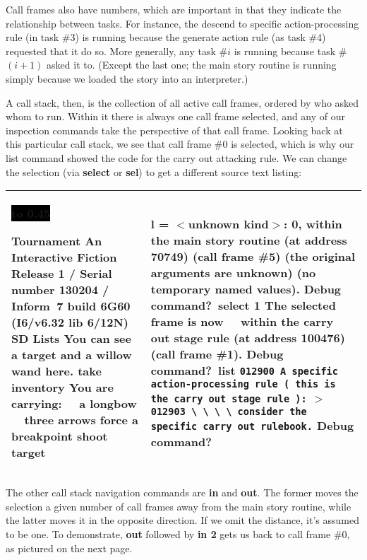 \documentclass{book}
\newcommand{\n}{\hspace*{\fill}\newline}
\newcommand{\terp}[2]{\begin{center}\begin{tabular}{p{0.45\textwidth}|p{0.45\textwidth}}\midrule #1&#2\\\midrule\end{tabular}\end{center}}
\newcommand{\glkheading}[1]{\textbf{#1}}
\newcommand{\glkinput}[1]{\textbf{#1}}
\newcommand{\glkstatusline}[2]{\centerline{\colorbox{black}{\hbox to 0.45\textwidth{\textcolor{white}{#1\hfil #2}}}}}
\newcommand{\storyprompt}{\raisebox{1.5pt}{\(>\)}}
\newcommand{\cursor}{\raisebox{-1.5pt}{\RectangleThin}}
\newcommand{\markedindent}{\(>\)\qquad}
\newcommand{\unmarkedindent}{\hphantom{\(>\)}\qquad}
\begin{document}
Call frames also have numbers, which are important in that they indicate the
relationship between tasks.  For instance, the descend to specific
action-processing rule (in task \#3) is running because the generate action rule
(as task \#4) requested that it do so.  More generally, any task \#\(i\) is
running because task \#\((i+1)\) asked it to.  (Except the last one; the main
story routine is running simply because we loaded the story into an
interpreter.)

A call stack, then, is the collection of all active call frames, ordered by who
asked whom to run.  Within it there is always one call frame selected, and any
of our inspection commands take the perspective of that call frame.  Looking
back at this particular call stack, we see that call frame \#0 is selected,
which is why our list command showed the code for the carry out attacking rule.
We can change the selection (via \glkinput{select} or \glkinput{sel}) to get a
different source text listing:

\terp{\glkstatusline{Lists}{0/2}\n
  \glkheading{Tournament}\n
  An Interactive Fiction\n
  Release 1 / Serial number 130204 / Inform~7 build 6G60 (I6/v6.32 lib 6/12N) SD\n
  \n
  \glkheading{Lists}\n
  You can see a target and a willow wand here.\n
  \n
  \storyprompt\glkinput{take inventory}\n
  You are carrying:\n
  \null\ \ a longbow\n
  \null\ \ three arrows\n
  \n
  \storyprompt\glkinput{force a breakpoint}\n
  \storyprompt\glkinput{shoot target}}{%
  \qquad \qquad l = \(<\)unknown kind\(>\): 0,\n
  within the main story routine (at address 70749) (call frame \#5)\n
  \null\qquad (the original arguments are unknown)\n
  \null\qquad (no temporary named values).\n
  \n
  Debug command?\ \glkinput{select 1}\n
  \n
  The selected frame is now\n
  \null\ \ within the carry out stage rule (at address 100476) (call frame \#1).\n
  \n
  Debug command?\ \glkinput{list}\n
  \n
  \unmarkedindent \lstinline{012900 A specific action-processing rule ( this is the carry out stage rule ):}\n
  \markedindent \lstinline{012903 \ \ \ \ consider the specific carry out rulebook.}\n
  \n
  Debug command?\ \cursor}

The other call stack navigation commands are \glkinput{in} and \glkinput{out}.
The former moves the selection a given number of call frames away from the main
story routine, while the latter moves it in the opposite direction.  If we omit
the distance, it's assumed to be one.  To demonstrate, \glkinput{out} followed
by \glkinput{in 2} gets us back to call frame \#0, as pictured on the next page.
\end{document}
